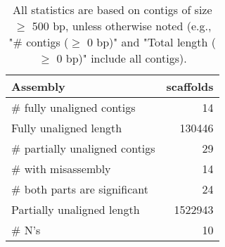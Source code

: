 \documentclass[12pt,a4paper]{article}
\begin{document}
\begin{table}[ht]
\begin{center}
\caption{All statistics are based on contigs of size $\geq$ 500 bp, unless otherwise noted (e.g., "\# contigs ($\geq$ 0 bp)" and "Total length ($\geq$ 0 bp)" include all contigs).}
\begin{tabular}{|l*{1}{|r}|}
\hline
Assembly & scaffolds \\ \hline
\# fully unaligned contigs & 14 \\ \hline
Fully unaligned length & 130446 \\ \hline
\# partially unaligned contigs & 29 \\ \hline
\hspace{5mm}\# with misassembly & 14 \\ \hline
\hspace{5mm}\# both parts are significant & 24 \\ \hline
Partially unaligned length & 1522943 \\ \hline
\# N's & 10 \\ \hline
\end{tabular}
\end{center}
\end{table}
\end{document}

